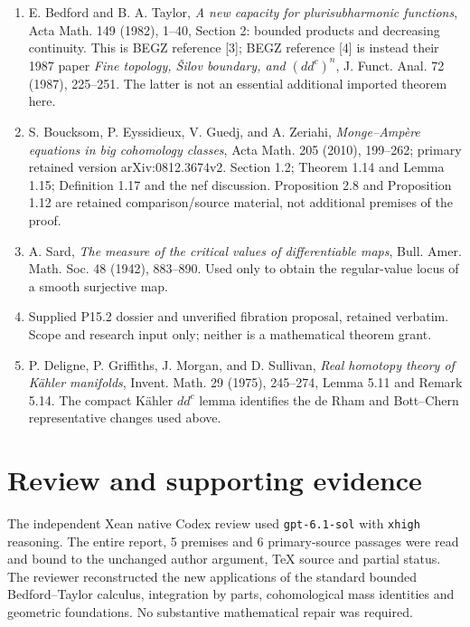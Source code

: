 \documentclass[
  11pt,
]{article}
\providecommand{\tightlist}{%
  \setlength{\itemsep}{0pt}\setlength{\parskip}{0pt}}
\begin{document}
\begin{enumerate}
\def\labelenumi{\arabic{enumi}.}
\tightlist
\item
  E. Bedford and B. A. Taylor, \emph{A new capacity for plurisubharmonic functions}, Acta Math. 149 (1982), 1--40, Section 2: bounded products and decreasing continuity. This is BEGZ reference {[}3{]}; BEGZ reference {[}4{]} is instead their 1987 paper \emph{Fine topology, Šilov boundary, and \((dd^c)^n\)}, J. Funct. Anal. 72 (1987), 225--251. The latter is not an essential additional imported theorem here.
\item
  S. Boucksom, P. Eyssidieux, V. Guedj, and A. Zeriahi, \emph{Monge--Ampère equations in big cohomology classes}, Acta Math. 205 (2010), 199--262; primary retained version arXiv:0812.3674v2. Section 1.2; Theorem 1.14 and Lemma 1.15; Definition 1.17 and the nef discussion. Proposition 2.8 and Proposition 1.12 are retained comparison/source material, not additional premises of the proof.
\item
  A. Sard, \emph{The measure of the critical values of differentiable maps}, Bull. Amer. Math. Soc. 48 (1942), 883--890. Used only to obtain the regular-value locus of a smooth surjective map.
\item
  Supplied P15.2 dossier and unverified fibration proposal, retained verbatim. Scope and research input only; neither is a mathematical theorem grant.
\item
  P. Deligne, P. Griffiths, J. Morgan, and D. Sullivan,
  \emph{Real homotopy theory of K\"ahler manifolds}, Invent. Math. 29
  (1975), 245--274, Lemma 5.11 and Remark 5.14. The compact K\"ahler
  \(dd^c\) lemma identifies the de Rham and Bott--Chern representative
  changes used above.
\end{enumerate}

\section*{Review and supporting evidence}

The independent Xean native Codex review used \texttt{gpt-6.1-sol} with
\texttt{xhigh} reasoning. The entire report, 5 premises and
6 primary-source passages were read and bound to the unchanged
author argument, TeX source and partial status. The reviewer reconstructed
the new applications of the standard bounded Bedford--Taylor calculus,
integration by parts, cohomological mass identities and geometric
foundations. No substantive mathematical repair was required.
\end{document}
